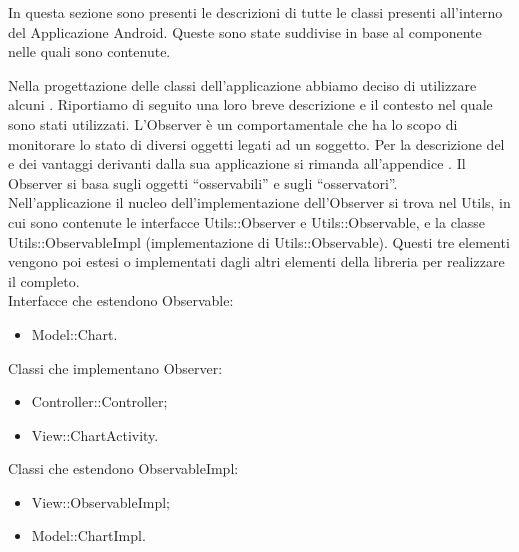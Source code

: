         In questa sezione sono presenti le descrizioni di tutte le classi presenti all'interno del  Applicazione Android. Queste sono state suddivise in base al componente nelle quali sono contenute.
        
        
    

        Nella progettazione delle classi dell'applicazione abbiamo deciso di utilizzare alcuni . Riportiamo di seguito una loro breve descrizione e il contesto nel quale sono stati utilizzati.
            L'Observer è un  comportamentale che ha lo scopo di monitorare lo stato di diversi oggetti legati ad un soggetto.
            Per la descrizione del  e dei vantaggi derivanti dalla sua applicazione si rimanda all'appendice .
                Il  Observer si basa sugli oggetti “osservabili” e sugli “osservatori”. \\ Nell'applicazione  il nucleo dell'implementazione dell'Observer si trova nel  Utils, in cui sono contenute le interfacce Utils::Observer e Utils::Observable, e la classe Utils::ObservableImpl (implementazione di Utils::Observable). Questi tre elementi vengono poi estesi o implementati dagli altri elementi della libreria per realizzare il  completo.\\
                Interfacce che estendono Observable:
                \begin{itemize}
                    \item Model::Chart.
                \end{itemize}
                Classi che implementano Observer:
                \begin{itemize}
                    \item Controller::Controller;
                    \item View::ChartActivity.
                \end{itemize}
                Classi che estendono ObservableImpl:
                \begin{itemize}
                    \item View::ObservableImpl;
                    \item Model::ChartImpl.
                \end{itemize}
